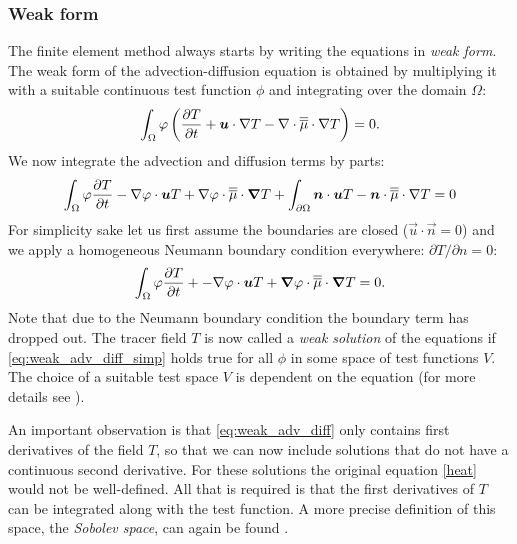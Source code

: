 \subsubsection{Weak form}
   The finite element method always starts by writing the
equations in \emph{weak form}.  The weak form of the advection-diffusion
equation is obtained by multiplying it with a suitable continuous test
function $\phi$ and integrating over the domain $\Omega$:
\begin{equation}
  \int_\Omega \varphi \left( \frac{\partial T}{\partial t} + {\mbox{\boldmath$u$}}\cdot\nabla T - 
    \nabla\cdot\overline{\overline{\mu}}\cdot \nabla T\right) = 0.
\end{equation}
We now integrate the advection and diffusion terms by parts:
\begin{equation}\label{eq:weak_adv_diff}
  \int_\Omega 
  \varphi \frac{\partial T}{\partial t} 
  -\nabla\varphi\cdot{\mbox{\boldmath$u$}} T +
  \nabla\varphi\cdot \overline{\overline{\mu}}\cdot{\mbox{\boldmath$\nabla$}} T 
  +\int_{\partial\Omega} {\mbox{\boldmath$n$}}\cdot {\mbox{\boldmath$u$}} T 
  - {\mbox{\boldmath$n$}}\cdot\overline{\overline{\mu}}\cdot\nabla T 
  = 0
\end{equation}
For simplicity sake let us first assume the boundaries are closed
($\vec{u}\cdot\vec{n}=0$) and we apply a homogeneous Neumann boundary
condition everywhere: $\partial T/\partial n=0$:
\begin{equation}\label{eq:weak_adv_diff_simp}
  \int_\Omega \varphi \frac{\partial T}{\partial t} + 
    -\nabla\varphi\cdot{\mbox{\boldmath$u$}} T + 
    {\mbox{\boldmath$\nabla$}}\varphi\cdot \overline{\overline{\mu}}\cdot{\mbox{\boldmath$\nabla$}} T = 0. 
\end{equation}
Note that due to the Neumann boundary condition the boundary term has
dropped out. The tracer field $T$ is now called a \emph{weak solution} of
the equations if \eqref{eq:weak_adv_diff_simp} holds true for all $\phi$ in some
space of test functions $V$. The choice of a suitable test space $V$ is dependent
on the equation (for more details see \citet{elman05}).

 An important observation is that
\eqref{eq:weak_adv_diff} only contains first derivatives of the field $T$,
so that we can now include solutions that do not have a continuous second
derivative. For these solutions the original equation \eqref{heat} would not
be well-defined. All that is required is that the first derivatives of $T$
can be integrated along with the test function. A more precise definition of
this space, the \emph{Sobolev space}, can again be found \citet{elman05}.

